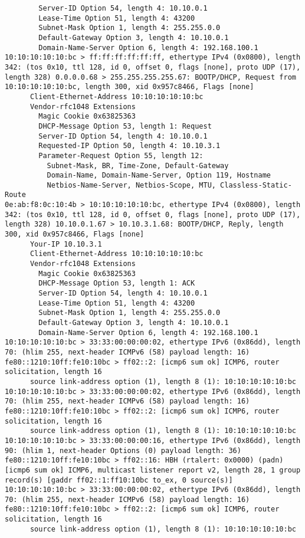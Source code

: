 \documentclass[a4paper,12pt]{article}
\begin{document}
\begin{Verbatim}
	    Server-ID Option 54, length 4: 10.10.0.1
	    Lease-Time Option 51, length 4: 43200
	    Subnet-Mask Option 1, length 4: 255.255.0.0
	    Default-Gateway Option 3, length 4: 10.10.0.1
	    Domain-Name-Server Option 6, length 4: 192.168.100.1
10:10:10:10:10:bc > ff:ff:ff:ff:ff:ff, ethertype IPv4 (0x0800), length 342: (tos 0x10, ttl 128, id 0, offset 0, flags [none], proto UDP (17), length 328) 0.0.0.0.68 > 255.255.255.255.67: BOOTP/DHCP, Request from 10:10:10:10:10:bc, length 300, xid 0x957c8466, Flags [none]
	  Client-Ethernet-Address 10:10:10:10:10:bc
	  Vendor-rfc1048 Extensions
	    Magic Cookie 0x63825363
	    DHCP-Message Option 53, length 1: Request
	    Server-ID Option 54, length 4: 10.10.0.1
	    Requested-IP Option 50, length 4: 10.10.3.1
	    Parameter-Request Option 55, length 12: 
	      Subnet-Mask, BR, Time-Zone, Default-Gateway
	      Domain-Name, Domain-Name-Server, Option 119, Hostname
	      Netbios-Name-Server, Netbios-Scope, MTU, Classless-Static-Route
0e:ab:f8:0c:10:4b > 10:10:10:10:10:bc, ethertype IPv4 (0x0800), length 342: (tos 0x10, ttl 128, id 0, offset 0, flags [none], proto UDP (17), length 328) 10.10.0.1.67 > 10.10.3.1.68: BOOTP/DHCP, Reply, length 300, xid 0x957c8466, Flags [none]
	  Your-IP 10.10.3.1
	  Client-Ethernet-Address 10:10:10:10:10:bc
	  Vendor-rfc1048 Extensions
	    Magic Cookie 0x63825363
	    DHCP-Message Option 53, length 1: ACK
	    Server-ID Option 54, length 4: 10.10.0.1
	    Lease-Time Option 51, length 4: 43200
	    Subnet-Mask Option 1, length 4: 255.255.0.0
	    Default-Gateway Option 3, length 4: 10.10.0.1
	    Domain-Name-Server Option 6, length 4: 192.168.100.1
10:10:10:10:10:bc > 33:33:00:00:00:02, ethertype IPv6 (0x86dd), length 70: (hlim 255, next-header ICMPv6 (58) payload length: 16) fe80::1210:10ff:fe10:10bc > ff02::2: [icmp6 sum ok] ICMP6, router solicitation, length 16
	  source link-address option (1), length 8 (1): 10:10:10:10:10:bc
10:10:10:10:10:bc > 33:33:00:00:00:02, ethertype IPv6 (0x86dd), length 70: (hlim 255, next-header ICMPv6 (58) payload length: 16) fe80::1210:10ff:fe10:10bc > ff02::2: [icmp6 sum ok] ICMP6, router solicitation, length 16
	  source link-address option (1), length 8 (1): 10:10:10:10:10:bc
10:10:10:10:10:bc > 33:33:00:00:00:16, ethertype IPv6 (0x86dd), length 90: (hlim 1, next-header Options (0) payload length: 36) fe80::1210:10ff:fe10:10bc > ff02::16: HBH (rtalert: 0x0000) (padn)[icmp6 sum ok] ICMP6, multicast listener report v2, length 28, 1 group record(s) [gaddr ff02::1:ff10:10bc to_ex, 0 source(s)]
10:10:10:10:10:bc > 33:33:00:00:00:02, ethertype IPv6 (0x86dd), length 70: (hlim 255, next-header ICMPv6 (58) payload length: 16) fe80::1210:10ff:fe10:10bc > ff02::2: [icmp6 sum ok] ICMP6, router solicitation, length 16
	  source link-address option (1), length 8 (1): 10:10:10:10:10:bc
\end{Verbatim}
\end{document}
